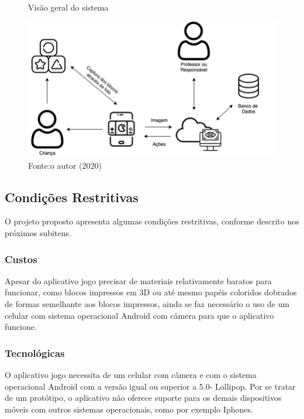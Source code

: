     \begin{figure}[h!]
        \centering
        \caption{Visão geral do sistema}
        \includegraphics[width=12cm]{images/cap3/diagrama_blocos.png}
        \caption*{Fonte:o autor (2020)}
        \label{figura:diagrama_blocos}
    \end{figure}
    
    \subsection{Condições Restritivas}
    O projeto proposto apresenta algumas condições restritivas, conforme descrito
    nos próximos subitens.

        \subsubsection{Custos}
        Apesar do aplicativo jogo precisar de materiais relativamente baratos para funcionar, como blocos impressos em 3D ou até mesmo papéis coloridos dobrados de formas semelhante aos blocos impressos, ainda se faz necessário o uso de um celular com sistema operacional Android com câmera para que o aplicativo funcione. 
            
        
        \subsubsection{Tecnológicas}
        O aplicativo jogo necessita de um celular com câmera e com o sistema operacional Android com a versão igual ou superior a 5.0- Lollipop. Por se tratar de um protótipo, o aplicativo não oferece suporte para os demais dispositivos móveis com outros sistemas operacionais, como por exemplo Iphones. 
        
